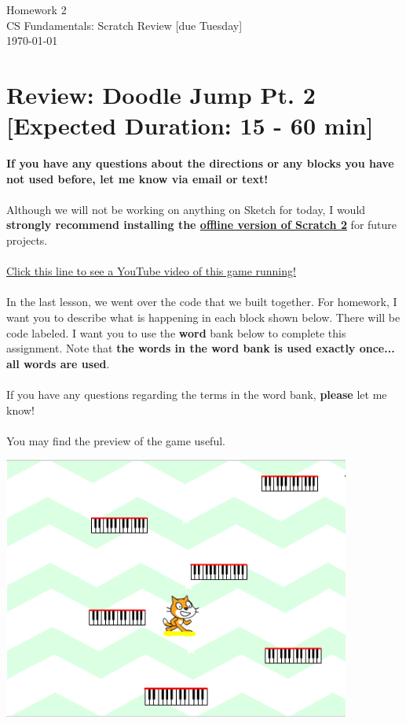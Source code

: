 \documentclass[11pt]{article}
\newcommand{\myhwname}{Homework 2}
\newcommand{\mysection}{CS Fundamentals: Scratch Review [due Tuesday]}
\begin{document}
\begin{center}
    {\Large \myhwname} \\
    \mysection \\
    \today
\end{center}

\section{Review: Doodle Jump Pt. 2 [Expected Duration: 15 - 60 min]}
\textbf{If you have any questions about the directions or any blocks you have not used before, let me know via email or text!}\\
\noindent\makebox[\linewidth]{\rule{\paperwidth}{0.4pt}}\\
Although we will not be working on anything on Sketch for today, I would \textbf{strongly recommend installing the \href{https://scratch.mit.edu/scratch2download/}{offline version of Scratch 2}} for future projects.\\\\
\href{https://youtu.be/ZJAsPQanvtg}{Click this line to see a YouTube video of this game running!}\\\\
In the last lesson, we went over the code that we built together. For homework, I want you to describe what is happening in each block shown below. There will be code labeled. I want you to use the \textbf{word} bank below to complete this assignment. Note that \textbf{the words in the word bank is used exactly once... all words are used}.\\\\
If you have any questions regarding the terms in the word bank, \textbf{please} let me know!\\\\
You may find the preview of the game useful.\\
\begin{center}
  \includegraphics[width=4.5in]{preview.png}
 \end{center}
\end{document}
